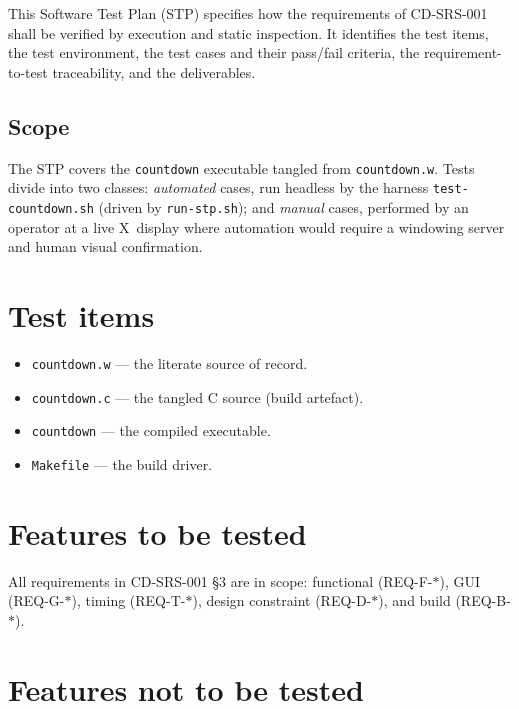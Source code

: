 \documentclass[12pt]{article}
\newcommand{\code}[1]{\texttt{#1}}
\begin{document}
This Software Test Plan (STP) specifies how the requirements of CD-SRS-001
shall be verified by execution and static inspection.  It identifies the
test items, the test environment, the test cases and their pass/fail
criteria, the requirement-to-test traceability, and the deliverables.

\subsection{Scope}

The STP covers the \code{countdown} executable tangled from
\code{countdown.w}.  Tests divide into two classes: \emph{automated} cases,
run headless by the harness \code{test-countdown.sh} (driven by
\code{run-stp.sh}); and \emph{manual} cases, performed by an operator at a
live X~display where automation would require a windowing server and human
visual confirmation.

\section{Test items}

\begin{itemize}[noitemsep]
  \item \code{countdown.w} --- the literate source of record.
  \item \code{countdown.c} --- the tangled C source (build artefact).
  \item \code{countdown} --- the compiled executable.
  \item \code{Makefile} --- the build driver.
\end{itemize}

\section{Features to be tested}

All requirements in CD-SRS-001 \S3 are in scope: functional
(REQ-F-$\ast$), GUI (REQ-G-$\ast$), timing (REQ-T-$\ast$), design
constraint (REQ-D-$\ast$), and build (REQ-B-$\ast$).

\section{Features not to be tested}
\end{document}
